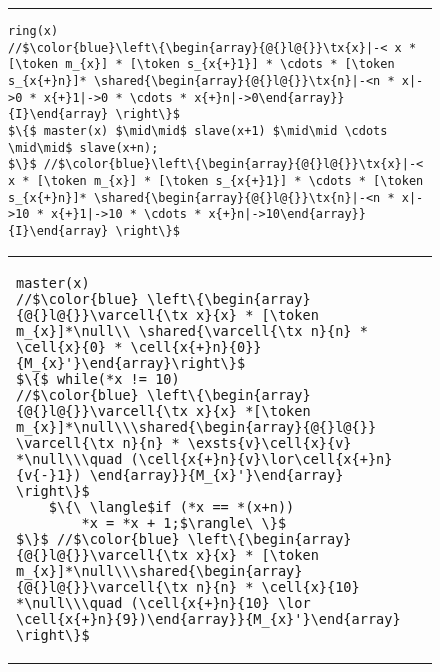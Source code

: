 \begin{figure}
\noindent\hrule\vspace{10pt}
\vspace{-3ex}
{\begin{lstlisting}[numbers=none,numbersep=5pt]
ring(x)
//$\color{blue}\left\{\begin{array}{@{}l@{}}\tx{x}|-< x * [\token m_{x}] * [\token s_{x{+}1}] * \cdots * [\token s_{x{+}n}]* \shared{\begin{array}{@{}l@{}}\tx{n}|-<n * x|->0 * x{+}1|->0 * \cdots * x{+}n|->0\end{array}}{I}\end{array} \right\}$
$\{$ master(x) $\mid\mid$ slave(x+1) $\mid\mid \cdots \mid\mid$ slave(x+n);
$\}$ //$\color{blue}\left\{\begin{array}{@{}l@{}}\tx{x}|-< x * [\token m_{x}] * [\token s_{x{+}1}] * \cdots * [\token s_{x{+}n}]* \shared{\begin{array}{@{}l@{}}\tx{n}|-<n * x|->10 * x{+}1|->10 * \cdots * x{+}n|->10\end{array}}{I}\end{array} \right\}$
\end{lstlisting}}
\vspace{-3ex}
\begin{tabular}{@{} l @{\hspace{8ex}} l@{}}
{\begin{lstlisting}
master(x)
//$\color{blue} \left\{\begin{array}{@{}l@{}}\varcell{\tx x}{x} * [\token m_{x}]*\null\\ \shared{\varcell{\tx n}{n} * \cell{x}{0} * \cell{x{+}n}{0}}{M_{x}'}\end{array}\right\}$
$\{$ while(*x != 10)
//$\color{blue} \left\{\begin{array}{@{}l@{}}\varcell{\tx x}{x} *[\token m_{x}]*\null\\\shared{\begin{array}{@{}l@{}} \varcell{\tx n}{n} * \exsts{v}\cell{x}{v} *\null\\\quad (\cell{x{+}n}{v}\lor\cell{x{+}n}{v{-}1}) \end{array}}{M_{x}'}\end{array} \right\}$
    $\{\ \langle$if (*x == *(x+n))
        *x = *x + 1;$\rangle\ \}$
$\}$ //$\color{blue} \left\{\begin{array}{@{}l@{}}\varcell{\tx x}{x} * [\token m_{x}]*\null\\\shared{\begin{array}{@{}l@{}}\varcell{\tx n}{n} * \cell{x}{10} *\null\\\quad (\cell{x{+}n}{10} \lor \cell{x{+}n}{9})\end{array}}{M_{x}'}\end{array} \right\}$

\end{lstlisting}}
\end{tabular}
\end{figure}
